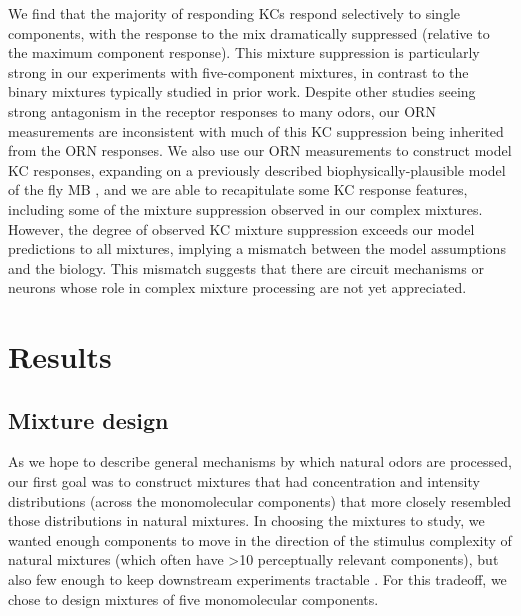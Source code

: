\documentclass[12pt]{caltech_thesis}
\renewcommand{\cite}{{ }\autocite}
\let\Oldsection\section
\renewcommand{\section}{\FloatBarrier\Oldsection}
\let\Oldsubsection\subsection
\renewcommand{\subsection}{\FloatBarrier\Oldsubsection}
\begin{document}
\begin{refsection}
We find that the majority of responding KCs respond selectively to single components, with the response to the mix dramatically suppressed (relative to the maximum component response).
This mixture suppression is particularly strong in our experiments with five-component mixtures, in contrast to the binary mixtures typically studied in prior work.
Despite other studies seeing strong antagonism in the receptor responses to many odors, our ORN measurements are inconsistent with much of this KC suppression being inherited from the ORN responses.
We also use our ORN measurements to construct model KC responses, expanding on a previously described biophysically-plausible model of the fly MB\cite{Kennedy2019}, and we are able to recapitulate some KC response features, including some of the mixture suppression observed in our complex mixtures.
However, the degree of observed KC mixture suppression exceeds our model predictions to all mixtures, implying a mismatch between the model assumptions and the biology.
This mismatch suggests that there are circuit mechanisms or neurons whose role in complex mixture processing are not yet appreciated.

\section{Results}
\subsection{Mixture design}
As we hope to describe general mechanisms by which natural odors are processed, our first goal was to construct mixtures that had concentration and intensity distributions (across the monomolecular components) that more closely resembled those distributions in natural mixtures.
In choosing the mixtures to study, we wanted enough components to move in the direction of the stimulus complexity of natural mixtures (which often have >10 perceptually relevant components), but also few enough to keep downstream experiments tractable\cite{BananaCode,GCRecombination3}.
For this tradeoff, we chose to design mixtures of five monomolecular components.



\end{refsection}
\end{document}
